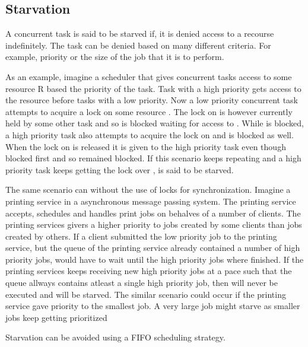 \subsection{Starvation}
A concurrent task is said to be starved if, it is denied access to a recourse indefinitely\cite[p. 459]{tanenbaum2008modern}. The task can be denied based on many different criteria. For example, priority or the size of the job that it is to perform.

As an example, imagine a scheduler that gives concurrent tasks access to some resource R based the priority of the task. Task with a high priority gets access to the resource before tasks with a low priority. Now a low priority concurrent task  attempts to acquire a lock on some resource . The lock on  is however currently held by some other task and so  is blocked waiting for access to . While  is blocked, a high priority task  also attempts to acquire the lock on  and is blocked as well. When the lock on  is released it is given to the high priority task  even though  blocked first and so  remained blocked. If this scenario keeps repeating and a high priority task keeps getting the lock over ,  is said to be starved.

The same scenario can without the use of locks for synchronization. Imagine a printing service in a asynchronous message passing system. The printing service accepts, schedules and handles print jobs on behalves of a number of clients. The printing services givers a higher priority to jobs created by some clients than jobs created by others. If a client submitted the low priority job  to the printing service, but the queue of the printing service already contained a number of high priority jobs,  would have to wait until the high priority jobs where finished. If the printing services keeps receiving new high priority jobs at a pace such that the queue allways contains atleast a single high priority job, then  will never be executed and will be starved. The similar scenario could occur if the printing service gave priority to the smallest job. A very large job might starve as smaller jobs keep getting prioritized

Starvation can be avoided using a \ac{FIFO} scheduling strategy\cite[p. 459]{tanenbaum2008modern}.

\worksheetend

